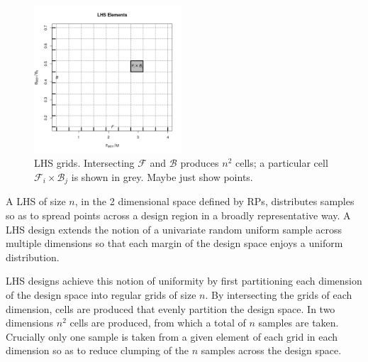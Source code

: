 \documentclass[12pt]{article}
\begin{document}
%
\begin{figure}
\includegraphics[width=0.49\textwidth]{../gpBias/designGrid.png}
\caption{ LHS grids. Intersecting $\mathcal{F}$ and $\mathcal{B}$ produces $n^2$
cells; a particular cell $\mathcal{F}_i\times\mathcal{B}_j$ is shown in grey. 
{\color{red} Maybe just show points.}
}
\end{figure}


%
A LHS of size $n$, in the 2 dimensional space defined 
by RPs, distributes samples so as to spread points across a design region in a 
broadly representative way. A LHS design extends the notion of a univariate 
random uniform sample across multiple dimensions so that each margin of the design 
space enjoys a uniform distribution. 

%
LHS designs achieve this notion of uniformity by first partitioning each dimension 
of the design space into regular grids of size $n$. By intersecting the grids 
of each dimension, cells are produced that evenly partition the design space. 
In two dimensions $n^2$ cells are produced, from which a total of $n$ samples 
are taken. Crucially only one sample is taken from a given element of each grid 
in each dimension so as to reduce clumping of the $n$ samples across the design space.
\end{document}
